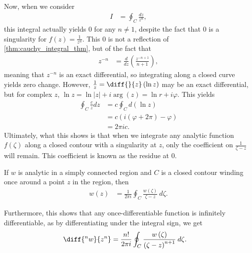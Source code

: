 \documentclass[10pt]{mypackage}
\begin{document}
Now, when we consider
\begin{align*}
  I &= \oint_{C}\frac{dz}{z^n},
\end{align*}
this integral actually yields $0$ for any $n\neq 1$, despite the fact that $0$ is a singularity for $f(z) = \frac{1}{z^n}$. This $0$ is not a reflection of \eqref{thm:cauchy_integral_thm}, but of the fact that
\begin{align*}
  z^{-n} &= \frac{d}{dz}\left(\frac{z^{-n+1}}{n+1}\right),
\end{align*}
meaning that $z^{-n}$ is an exact differential, so integrating along a closed curve yields zero change. However, $\frac{1}{z} = \diff{}{z}\left(\ln z\right)$ may be an exact differential, but for complex $z$, $\ln z = \ln\left\vert z \right\vert + i\arg(z) = \ln r + i\varphi$. This yields
\begin{align*}
  \oint_{C} \frac{c}{z}dz &= c\oint_{C} d\left(\ln z\right)\\
                          &= c\left(i\left(\varphi + 2\pi\right) - \varphi\right)\\
                          &= 2\pi i c.
\end{align*}
Ultimately, what this shows is that when we integrate any analytic function $f\left(\zeta\right)$ along a closed contour with a singularity at $z$, only the coefficient on $\frac{1}{\zeta -z}$ will remain. This coefficient is known as the residue at $0$.
\begin{theorem}
  If $w$ is analytic in a simply connected region and $C$ is a closed contour winding once around a point $z$ in the region, then
  \begin{align*}
    w(z) &= \frac{1}{2\pi i} \oint_{C}\frac{w\left(\zeta\right)}{\zeta - z}\:d\zeta.
  \end{align*}
\end{theorem}
Furthermore, this shows that any once-differentiable function is infinitely differentiable, as by differentiating under the integral sign, we get
\begin{align*}
  \diff{^nw}{z^n} &= \frac{n!}{2\pi i} \oint_{C} \frac{w\left(\zeta\right)}{\left(\zeta - z\right)^{n+1}}\: d\zeta.
\end{align*}
\end{document}
